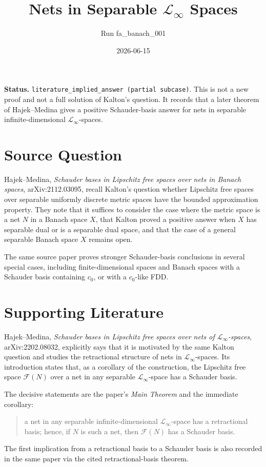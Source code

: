 \documentclass[11pt]{amsart}
\begin{document}
\title{Nets in Separable \texorpdfstring{\(\mathcal L_\infty\)}{L-infinity} Spaces}
\author{Run fa\_banach\_001}
\date{2026-06-15}
\maketitle

\noindent
\textbf{Status.} \texttt{literature\_implied\_answer (partial subcase)}.
This is not a new proof and not a full solution of Kalton's question. It
records that a later theorem of Hajek--Medina gives a positive Schauder-basis
answer for nets in separable infinite-dimensional \(\mathcal L_\infty\)-spaces.

\section*{Source Question}

Hajek--Medina, \emph{Schauder bases in Lipschitz free spaces over nets in
Banach spaces}, arXiv:2112.03095, recall Kalton's question whether
Lipschitz free spaces over separable uniformly discrete metric spaces have the
bounded approximation property. They note that it suffices to consider the
case where the metric space is a net \(N\) in a Banach space \(X\), that
Kalton proved a positive answer when \(X\) has separable dual or is a
separable dual space, and that the case of a general separable Banach space
\(X\) remains open.

The same source paper proves stronger Schauder-basis conclusions in several
special cases, including finite-dimensional spaces and Banach spaces with a
Schauder basis containing \(c_0\), or with a \(c_0\)-like FDD.

\section*{Supporting Literature}

Hajek--Medina, \emph{Schauder bases in Lipschitz free spaces over nets of
\(\mathcal L_\infty\)-spaces}, arXiv:2202.08032, explicitly says that it is
motivated by the same Kalton question and studies the retractional structure
of nets in \(\mathcal L_\infty\)-spaces. Its introduction states that, as a
corollary of the construction, the Lipschitz free space \(\mathcal F(N)\) over
a net in any separable \(\mathcal L_\infty\)-space has a Schauder basis.

The decisive statements are the paper's \emph{Main Theorem} and the immediate
corollary:
\begin{quote}
  a net in any separable infinite-dimensional \(\mathcal L_\infty\)-space has
  a retractional basis; hence, if \(N\) is such a net, then
  \(\mathcal F(N)\) has a Schauder basis.
\end{quote}
The first implication from a retractional basis to a Schauder basis is also
recorded in the same paper via the cited retractional-basis theorem.
\end{document}
